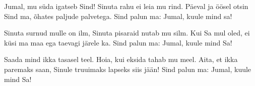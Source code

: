 Jumal, mu s\"uda igatseb Sind!
Sinuta rahu ei leia mu rind.
P\"aeval ja \"o\"osel otsin Sind ma,
\~ohates paljude palvetega.
Sind palun ma:
Jumal, kuule mind sa!

Sinuta surnud mulle on ilm,
Sinuta pisaraid nutab mu silm.
Kui Sa mul oled, ei k\"usi ma
maa ega taevagi j\"arele ka.
Sind palun ma:
Jumal, kuule mind Sa!

Saada mind ikka tasasel teel.
Hoia, kui eksida tahab mu meel.
Aita, et ikka paremaks saan,
Sinule truuimaks lapseks siis j\"a\"an!
Sind palun ma: 
Jumal, kuule mind Sa!